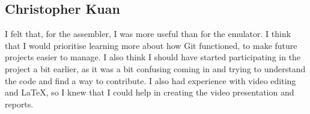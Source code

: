 \documentclass{article}
\begin{document}
\subsection*{Christopher Kuan}
I felt that, for the assembler, I was more useful than for the emulator. I think that I would prioritise learning more about how Git functioned, to make future projects easier to manage. I also think I should have started participating in the project a bit earlier, as it was a bit confusing coming in and trying to understand the code and find a way to contribute. I also had experience with video editing and LaTeX, so I knew that I could help in creating the video presentation and reports.
\end{document}
